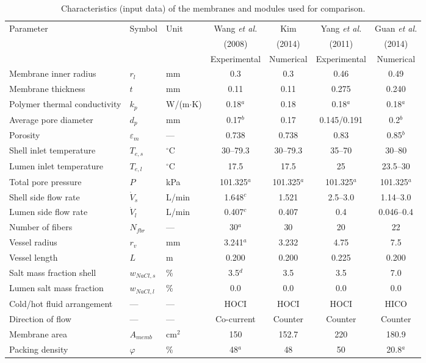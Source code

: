 \documentclass[14pt,letterpaper,fleqn]{extarticle}
\renewcommand{\textbf}[1]{#1}
\begin{document}
\begin{table}[!htbp]
\centering
\caption{Characteristics (input data) of the membranes and modules used for comparison.}
\label{tab:membranes}
\footnotesize
\setlength{\tabcolsep}{4pt}
\begin{tabularx}{\textwidth}{@{}Xllcccc@{}}
\toprule
\textbf{Parameter} & \textbf{Symbol} & \textbf{Unit}
  & \textbf{Wang \textit{et al.}} 
  & \textbf{Kim}
  & \textbf{Yang \textit{et al.}}
  & \textbf{Guan \textit{et al.}} \\
 & & & \textbf{(2008)} & \textbf{(2014)} & \textbf{(2011)} & \textbf{(2014)} \\
\midrule
 & & & Experimental & Numerical & Experimental & Numerical \\
\midrule
Membrane inner radius & $r_l$ & mm & 0.3 & 0.3 & 0.46 & 0.49 \\
Membrane thickness & $t$ & mm & 0.11 & 0.11 & 0.275 & 0.240 \\
Polymer thermal conductivity & $k_p$ & W/(m$\cdot$K) & 0.18$^a$ & 0.18 & 0.18$^a$ & 0.18$^a$ \\
Average pore diameter & $d_p$ & mm & 0.17$^b$ & 0.17 & 0.145/0.191 & 0.2$^b$ \\
Porosity & $\varepsilon_m$ & --- & 0.738 & 0.738 & 0.83 & 0.85$^b$ \\
Shell inlet temperature & $T_{e,s}$ & $^\circ$C & 30--79.3 & 30--79.3 & 35--70 & 30--80 \\
Lumen inlet temperature & $T_{e,l}$ & $^\circ$C & 17.5 & 17.5 & 25 & 23.5--30 \\
Total pore pressure & $P$ & kPa & 101.325$^a$ & 101.325$^a$ & 101.325$^a$ & 101.325$^a$ \\
Shell side flow rate & $\dot{V}_s$ & L/min & 1.648$^c$ & 1.521 & 2.5--3.0 & 1.14--3.0 \\
Lumen side flow rate & $\dot{V}_l$ & L/min & 0.407$^c$ & 0.407 & 0.4 & 0.046--0.4 \\
Number of fibers & $N_{fbr}$ & --- & 30$^a$ & 30 & 20 & 22 \\
Vessel radius & $r_v$ & mm & 3.241$^a$ & 3.232 & 4.75 & 7.5 \\
Vessel length & $L$ & m & 0.200 & 0.200 & 0.225 & 0.200 \\
Salt mass fraction shell & $w_{NaCl,s}$ & \% & 3.5$^d$ & 3.5 & 3.5 & 7.0 \\
Lumen salt mass fraction & $w_{NaCl,l}$ & \% & 0.0 & 0.0 & 0.0 & 0.0 \\
Cold/hot fluid arrangement & --- & --- & HOCI & HOCI & HOCI & HICO \\
Direction of flow & --- & --- & Co-current & Counter & Counter & Counter \\
Membrane area & $A_{memb}$ & cm$^2$ & 150 & 152.7 & 220 & 180.9 \\
Packing density & $\varphi$ & \% & 48$^a$ & 48 & 50 & 20.8$^a$ \\
\bottomrule
\end{tabularx}


\end{table}
\end{document}
